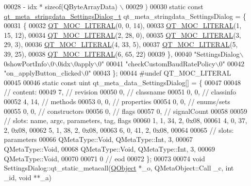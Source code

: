\begin{DoxyCode}
00028 \textcolor{preprocessor}{        - idx * sizeof(QByteArrayData) \(\backslash\)}
00029 \textcolor{preprocessor}{    )}
00030 \textcolor{keyword}{static} \textcolor{keyword}{const} \hyperlink{a00069_d1/de1/a00213}{qt\_meta\_stringdata\_SettingsDialog\_t} 
      qt\_meta\_stringdata\_SettingsDialog = \{
00031     \{
00032 \hyperlink{a00069_a75bb9482d242cde0a06c9dbdc6b83abe}{QT\_MOC\_LITERAL}(0, 0, 14),
00033 \hyperlink{a00069_a75bb9482d242cde0a06c9dbdc6b83abe}{QT\_MOC\_LITERAL}(1, 15, 12),
00034 \hyperlink{a00069_a75bb9482d242cde0a06c9dbdc6b83abe}{QT\_MOC\_LITERAL}(2, 28, 0),
00035 \hyperlink{a00069_a75bb9482d242cde0a06c9dbdc6b83abe}{QT\_MOC\_LITERAL}(3, 29, 3),
00036 \hyperlink{a00069_a75bb9482d242cde0a06c9dbdc6b83abe}{QT\_MOC\_LITERAL}(4, 33, 5),
00037 \hyperlink{a00069_a75bb9482d242cde0a06c9dbdc6b83abe}{QT\_MOC\_LITERAL}(5, 39, 25),
00038 \hyperlink{a00069_a75bb9482d242cde0a06c9dbdc6b83abe}{QT\_MOC\_LITERAL}(6, 65, 22)
00039     \},
00040     \textcolor{stringliteral}{"SettingsDialog\(\backslash\)0showPortInfo\(\backslash\)0\(\backslash\)0idx\(\backslash\)0apply\(\backslash\)0"}
00041     \textcolor{stringliteral}{"checkCustomBaudRatePolicy\(\backslash\)0"}
00042     \textcolor{stringliteral}{"on\_applyButton\_clicked\(\backslash\)0"}
00043 \};
00044 \textcolor{preprocessor}{#undef QT\_MOC\_LITERAL}
00045 
00046 \textcolor{keyword}{static} \textcolor{keyword}{const} uint qt\_meta\_data\_SettingsDialog[] = \{
00047 
00048  \textcolor{comment}{// content:}
00049        7,       \textcolor{comment}{// revision}
00050        0,       \textcolor{comment}{// classname}
00051        0,    0, \textcolor{comment}{// classinfo}
00052        4,   14, \textcolor{comment}{// methods}
00053        0,    0, \textcolor{comment}{// properties}
00054        0,    0, \textcolor{comment}{// enums/sets}
00055        0,    0, \textcolor{comment}{// constructors}
00056        0,       \textcolor{comment}{// flags}
00057        0,       \textcolor{comment}{// signalCount}
00058 
00059  \textcolor{comment}{// slots: name, argc, parameters, tag, flags}
00060        1,    1,   34,    2, 0x08,
00061        4,    0,   37,    2, 0x08,
00062        5,    1,   38,    2, 0x08,
00063        6,    0,   41,    2, 0x08,
00064 
00065  \textcolor{comment}{// slots: parameters}
00066     QMetaType::Void, QMetaType::Int,    3,
00067     QMetaType::Void,
00068     QMetaType::Void, QMetaType::Int,    3,
00069     QMetaType::Void,
00070 
00071        0        \textcolor{comment}{// eod}
00072 \};
00073 
00074 \textcolor{keywordtype}{void} SettingsDialog::qt\_static\_metacall(\hyperlink{a00059}{QObject} *\_o, QMetaObject::Call \_c, \textcolor{keywordtype}{int} \_id, \textcolor{keywordtype}{void} **\_a)

\end{DoxyCode}
